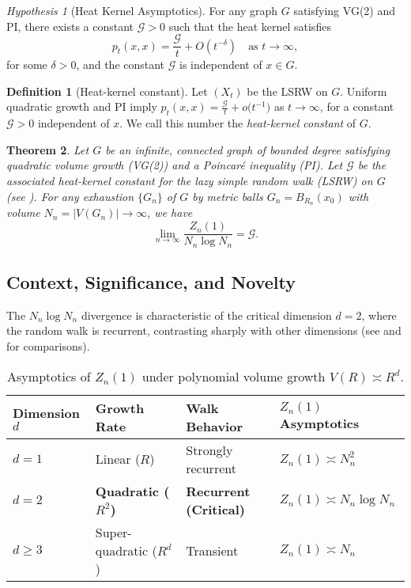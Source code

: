 \documentclass{article}
\numberwithin{equation}{section}
\newtheorem{theorem}{Theorem}[section]
\theoremstyle{definition}
\newtheorem{definition}[theorem]{Definition}
\theoremstyle{remark}
\newcommand{\cG}{\mathcal{G}}    %
\newtheorem{hypothesis}{Hypothesis}[section]
\begin{document}
\begin{hypothesis}[Heat Kernel Asymptotics]\label{hyp:HK}
For any graph \( G \) satisfying VG(2) and PI, there exists a constant \( \mathcal{G} > 0 \) such that the heat kernel satisfies
	\[
	p_t(x,x) = \frac{\mathcal{G}}{t} + O(t^{-\delta}) \quad \text{as } t \to \infty,
	\]
for some \( \delta > 0 \), and the constant \( \mathcal{G} \) is independent of \( x \in G \).
\end{hypothesis}

\begin{definition}[Heat-kernel constant]\label{def:G}
Let $(X_t)$ be the LSRW on $G$. Uniform quadratic growth and PI imply
\(
    p_t(x,x)=\frac{\cG}{t}+o\!\bigl(t^{-1}\bigr)
\)
as $t\to\infty$, for a constant $\cG>0$ independent of $x$. We call this number the \emph{heat-kernel constant} of $G$.
\end{definition}

\begin{theorem}\label{thm:main}
Let $G$ be an infinite, connected graph of bounded degree satisfying quadratic volume growth (VG(2)) and a Poincaré inequality (PI). Let $\cG$ be the associated heat-kernel constant for the lazy simple random walk (LSRW) on $G$ (see ). For any exhaustion $\{G_n\}$ of $G$ by metric balls $G_n = B_{R_n}(x_0)$ with volume $N_n = |V(G_n)| \to \infty$, we have
\[
\lim_{n \to \infty} \frac{Z_n(1)}{N_n \log N_n} = \cG.
\]
\end{theorem}

\subsection{Context, Significance, and Novelty}
The $N_n \log N_n$ divergence is characteristic of the critical dimension $d=2$, where the random walk is recurrent, contrasting sharply with other dimensions (see  and  for comparisons).

\begin{table}[h!]
\centering
\caption{Asymptotics of $Z_n(1)$ under polynomial volume growth $V(R) \asymp R^d$.}
\label{tab:growth}
\begin{tabular}{@{}llll@{}}
\toprule
\textbf{Dimension} $d$ & \textbf{Growth Rate} & \textbf{Walk Behavior} & $Z_n(1)$ \textbf{Asymptotics} \\
\midrule
$d=1$ & Linear ($R$) & Strongly recurrent & $Z_n(1) \asymp N_n^2$ \\
\textbf{$d=2$} & \textbf{Quadratic ($R^2$)} & \textbf{Recurrent (Critical)} & $Z_n(1) \asymp N_n \log N_n$ \\
$d\geq 3$ & Super-quadratic ($R^d$) & Transient & $Z_n(1) \asymp N_n$ \\
\bottomrule
\end{tabular}
\end{table}
\end{document}
